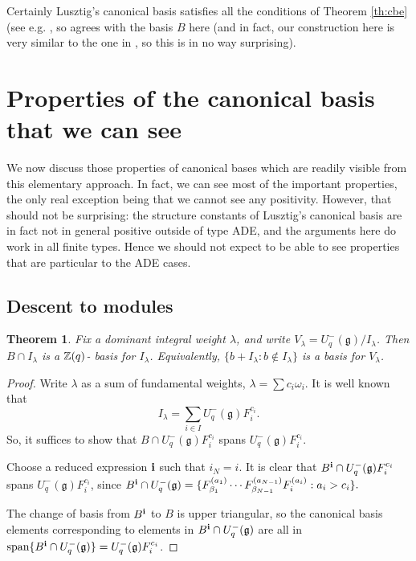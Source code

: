\documentclass[11pt]{amsart}
\numberwithin{equation}{section}
\newtheorem{Theorem}{Theorem}[section]
\theoremstyle{definition}
\newcommand{\g}{\mathfrak{g}}
\begin{document}
Certainly Lusztig's canonical basis satisfies all the conditions of Theorem \ref{th:cbe} (see e.g. \cite[Theorem 3. 2]{L90b}, so agrees with the basis $B$ here (and in fact, our construction here is very similar to the one in \cite{L90b}, so this is in no way surprising).

\section{Properties of the canonical basis that we can see}

We now discuss those properties of canonical bases which are readily visible from this elementary approach. In fact, we can see most of the important properties, the only real exception being that we cannot see any positivity. However, that should not be surprising: the structure constants of Lusztig's canonical basis are in fact not in general positive outside of type ADE, and the arguments here do work in all finite types. Hence we should not expect to be able to see properties that are particular to the ADE cases. 

\subsection{Descent to modules}

\begin{Theorem}
Fix a dominant integral weight $\lambda$, and write $V_\lambda= U^-_q(\g)/I_\lambda$. Then $B \cap I_\lambda$ is a ${\Bbb Z}(q)$- basis for $I_\lambda$. Equivalently, $\{ b+I_\lambda : b \not\in I_\lambda \}$ is a basis for $V_\lambda$.  
\end{Theorem}

\begin{proof}

Write $\lambda$ as a sum of fundamental weights, $\lambda = \sum c_i \omega_i$.
It is well known that 
\begin{equation} \label{eq:BGG}
I_\lambda = \sum_{i \in I} U^-_q(\g) F_i^{c_i}.
\end{equation}
So, it suffices to show that
$B \cap U^-_q(\g) F_i^{c_i}$ spans $U^-_q(\g) F_i^{c_i}$. 

Choose a reduced expression ${\bf i}$ such that $i_N=i$. It is clear that $B^{\bf i} \cap U^-_q(\g) F_i^{c_i}$ spans $U^-_q(\g) F_i^{c_i}$, since 
$B^{\bf i} \cap U^-_q(\g) = \{ F_{\beta_1}^{(a_1)} \cdots F_{\beta_{N-1}}^{(a_{N-1})} F_i^{(a_i)} : a_i >c_i \}.$

The change of basis from $B^{\bf i}$ to $B$ is upper triangular, so the canonical basis elements corresponding to elements in $B^{\bf i} \cap U^-_q(\g) $
are all in $\text{span} \{B^{\bf i} \cap U^-_q(\g) \}= U^-_q(\g) F_i^{c_i}$.
\end{proof}
\end{document}

